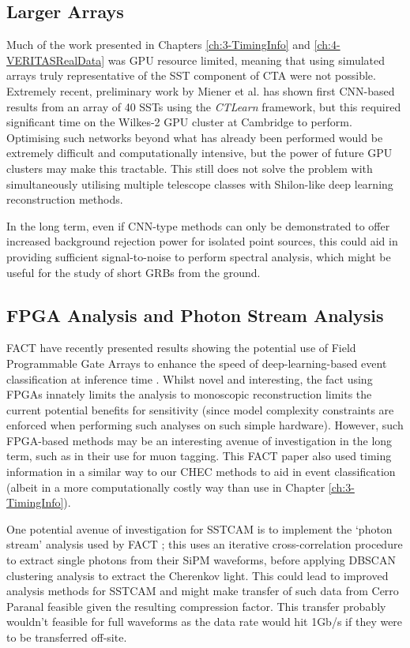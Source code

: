 \subsection{Larger Arrays}
Much of the work presented in Chapters \ref{ch:3-TimingInfo} and \ref{ch:4-VERITASRealData} was GPU resource limited, meaning that using simulated arrays truly representative of the SST component of CTA were not possible. Extremely recent, preliminary work by Miener et al. \cite{tjarkicrc} has shown first CNN-based results from an array of 40 SSTs using the \textit{CTLearn} framework, but this required significant time on the Wilkes-2 GPU cluster at Cambridge to perform. Optimising such networks beyond what has already been performed would be extremely difficult and computationally intensive, but the power of future GPU clusters may make this tractable. This still does not solve the problem with simultaneously utilising multiple telescope classes with Shilon-like deep learning reconstruction methods.

In the long term, even if CNN-type methods can only be demonstrated to offer increased background rejection power for isolated point sources, this could aid in providing sufficient signal-to-noise to perform spectral analysis, which might be useful for the study of short GRBs from the ground.

\subsection{FPGA Analysis and Photon Stream Analysis}

FACT have recently presented results showing the potential use of Field Programmable Gate Arrays to enhance the speed of deep-learning-based event classification at inference time \cite{factfpga}. Whilst novel and interesting, the fact using FPGAs innately limits the analysis to monoscopic reconstruction limits the current potential benefits for sensitivity (since model complexity constraints are enforced when performing such analyses on such simple hardware). However, such FPGA-based methods may be an interesting avenue of investigation in the long term, such as in their use for muon tagging. This FACT paper also used timing information in a similar way to our CHEC methods to aid in event classification (albeit in a more computationally costly way than use in Chapter \ref{ch:3-TimingInfo}).

One potential avenue of investigation for SSTCAM is to implement the `photon stream' analysis used by FACT \cite{factphotonstream}; this uses an iterative cross-correlation procedure to extract single photons from their SiPM waveforms, before applying DBSCAN clustering analysis to extract the Cherenkov light. This could lead to improved analysis methods for SSTCAM and might make transfer of such data from Cerro Paranal feasible given the resulting compression factor. This transfer probably wouldn't feasible for full waveforms as the data rate would hit 1Gb/s \cite{trigrate} if they were to be transferred off-site.

